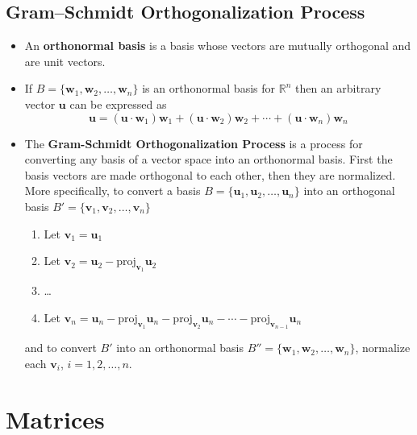 \documentclass{article}
\begin{document}
\subsection{Gram–Schmidt Orthogonalization Process}

\begin{itemize}
  \item An \textbf{orthonormal basis} is a basis whose vectors are mutually orthogonal and are unit vectors.

  \item If $B = \{\mathbf{w}_1, \mathbf{w}_2, \ldots, \mathbf{w}_n\}$ is an orthonormal basis for $\mathbb{R}^n$ then an arbitrary vector $\mathbf{u}$ can be expressed as \[\mathbf{u} = (\mathbf{u} \cdot \mathbf{w}_1) \mathbf{w}_1 + (\mathbf{u} \cdot \mathbf{w}_2) \mathbf{w}_2 + \cdots + (\mathbf{u} \cdot \mathbf{w}_n) \mathbf{w}_n\]

  \item The \textbf{Gram-Schmidt Orthogonalization Process} is a process for converting any basis of a vector space into an orthonormal basis. First the basis vectors are made orthogonal to each other, then they are normalized. More specifically, to convert a basis $B = \{\mathbf{u}_1, \mathbf{u}_2, \ldots, \mathbf{u}_n\}$ into an orthogonal basis $B' = \{\mathbf{v}_1, \mathbf{v}_2, \ldots, \mathbf{v}_n\}$

        \begin{enumerate}
          \item Let $\mathbf{v}_1 = \mathbf{u}_1$

          \item Let $\mathbf{v}_2 = \mathbf{u}_2 - \text{proj}_{\mathbf{v}_1} \mathbf{u}_2$

          \item \ldots

          \item Let $\mathbf{v}_n = \mathbf{u}_n - \text{proj}_{\mathbf{v}_1} \mathbf{u}_n - \text{proj}_{\mathbf{v}_2} \mathbf{u}_n - \cdots - \text{proj}_{\mathbf{v}_{n - 1}} \mathbf{u}_n$
        \end{enumerate}

        and to convert $B'$ into an orthonormal basis $B'' = \{\mathbf{w}_1, \mathbf{w}_2, \ldots, \mathbf{w}_n\}$, normalize each $\mathbf{v}_i$, $i = 1, 2, \ldots, n$.
\end{itemize}

\section{Matrices}
\end{document}

